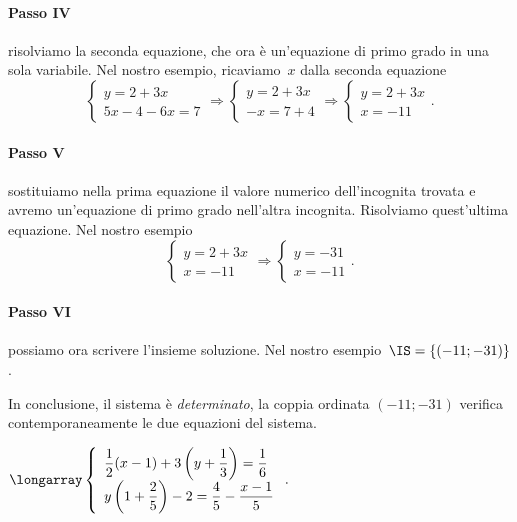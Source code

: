 \begin{exrig}
\paragraph{Passo IV} risolviamo la seconda equazione, che ora è
un'equazione di primo grado in una sola variabile.
Nel nostro esempio, ricaviamo~$x$ dalla seconda equazione
\[\left\{\begin{array}{l}
	 y=2+3x\\
	 5x-4-6x=7
	\end{array}\right.\Rightarrow
 \left\{\begin{array}{l}y=2+3x\\
	 -x=7+4
	\end{array}\right.\Rightarrow
 \left\{\begin{array}{l}y=2+3x\\
	 x=-11
  \end{array}\right..\]

\paragraph{Passo V} sostituiamo nella prima equazione il valore
numerico dell'incognita trovata e avremo
un'equazione di primo grado nell'altra incognita. Risolviamo
quest'ultima equazione.
Nel nostro esempio
\[ \left\{\begin{array}{l}y=2+3x\\
	 x=-11
  \end{array}\right.\Rightarrow
  \left\{\begin{array}{l}
	 y=-31\\
	 x=-11
  \end{array}\right..\]

\paragraph{Passo VI} possiamo ora scrivere l'insieme soluzione.
Nel nostro esempio~$\IS=\{(-11;-31)\}$.

In conclusione, il sistema è \emph{determinato}, la coppia ordinata
$(-11;-31)$ verifica contemporaneamente le due equazioni del sistema.

\begin{esempio}
$\longarray\left\{\begin{array}{l}
	\dfrac{1}{2}(x-1)+3\left(y+\dfrac{1}{3}\right)=\dfrac{1}{6}\\
	y\left(1+\dfrac{2}{5}\right)-2=\dfrac{4}{5}-\dfrac{x-1}{5}
	\end{array}\right..$


\end{esempio}
\end{exrig}
